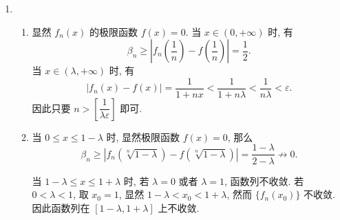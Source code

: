 \documentclass[a4paper, 11pt]{ctexart}
\begin{document}
\begin{enumerate}
    \item %
        \begin{enumerate}[(1)]
            \item %
                显然 $f_n(x)$ 的极限函数 $f(x) = 0$. 当 $x\in(0, +\infty)$ 时, 有
                \[
                    \beta_n \geq \left| f_n\left(\frac1n\right) - f\left(\frac1n\right) \right| = \frac12.   
                \]
                当 $x \in (\lambda, +\infty)$ 时, 有
                \[
                    \left| f_n(x) - f(x) \right| = \frac{1}{1+nx} < \frac{1}{1+n\lambda} < \frac{1}{n\lambda} < \varepsilon.    
                \]
                因此只要 $n > \left[\dfrac{1}{\lambda\varepsilon}\right]$ 即可.
            \item %
                当 $0 \leq x \leq 1 - \lambda$ 时, 显然极限函数 $f(x) = 0$, 那么
                \[
                    \beta_n \geq |f_n(\sqrt[n]{1-\lambda}) - f(\sqrt[n]{1-\lambda})| = \frac{1-\lambda}{2-\lambda} \not\to 0.
                \]
                
                当 $1-\lambda \leq x \leq 1+\lambda$ 时, 若 $\lambda = 0$ 或者 $\lambda = 1$, 函数列不收敛. 若 $0 < \lambda < 1$, 取 $x_0 = 1$,
                显然 $1-\lambda < x_0 < 1 + \lambda$, 然而 $\{f_n(x_0)\}$ 不收敛. 因此函数列在 $[1-\lambda, 1+\lambda]$ 上不收敛.


\end{enumerate}
\end{enumerate}
\end{document}
